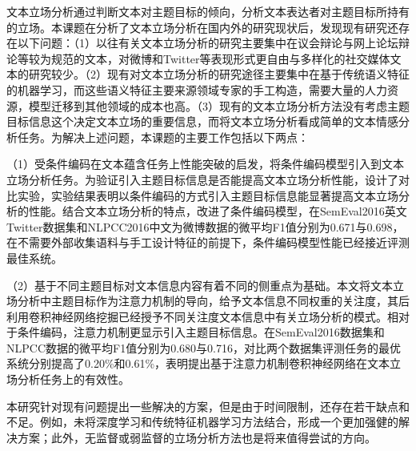 

文本立场分析通过判断文本对主题目标的倾向，分析文本表达者对主题目标所持有的立场。本课题在分析了文本立场分析在国内外的研究现状后，发现现有研究还存在以下问题：（1）以往有关文本立场分析的研究主要集中在议会辩论与网上论坛辩论等较为规范的文本，对微博和Twitter等表现形式更自由与多样化的社交媒体文本的研究较少。（2）现有对文本立场分析的研究途径主要集中在基于传统语义特征的机器学习，而这些语义特征主要来源领域专家的手工构造，需要大量的人力资源，模型迁移到其他领域的成本也高。（3）现有的文本立场分析方法没有考虑主题目标信息这个决定文本立场的重要信息，而将文本立场分析看成简单的文本情感分析任务。为解决上述问题，本课题的主要工作包括以下两点：

（1）受条件编码在文本蕴含任务上性能突破的启发，将条件编码模型引入到文本立场分析任务。为验证引入主题目标信息是否能提高文本立场分析性能，设计了对比实验，实验结果表明以条件编码的方式引入主题目标信息能显著提高文本立场分析的性能。结合文本立场分析的特点，改进了条件编码模型，在SemEval2016英文Twitter数据集和NLPCC2016中文为微博数据的微平均F1值分别为0.671与0.698，在不需要外部收集语料与手工设计特征的前提下，条件编码模型性能已经接近评测最佳系统。

（2）基于不同主题目标对文本信息内容有着不同的侧重点为基础。本文将文本立场分析中主题目标作为注意力机制的导向，给予文本信息不同权重的关注度，其后利用卷积神经网络挖掘已经授予不同关注度文本信息中有关立场分析的模式。相对于条件编码，注意力机制更显示引入主题目标信息。在SemEval2016数据集和NLPCC数据的微平均F1值分别为0.680与0.716，对比两个数据集评测任务的最优系统分别提高了0.20\%和0.61\%，表明提出基于注意力机制卷积神经网络在文本立场分析任务上的有效性。

本研究针对现有问题提出一些解决的方案，但是由于时间限制，还存在若干缺点和不足。例如，未将深度学习和传统特征机器学习方法结合，形成一个更加强健的解决方案；此外，无监督或弱监督的立场分析方法也是将来值得尝试的方向。